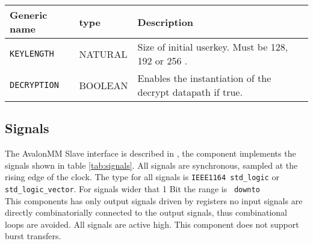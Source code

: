 \documentclass{ruschidoc}
\begin{document}
\begin{tabularx}{\textwidth}{|p{33mm}|p{25mm}|X|}
  \hline
  \bf{Generic name} & \bf{type} & \bf{Description}\\ \hline
  \texttt{KEYLENGTH}  \label{gen:keylength}	& NATURAL   & Size of initial userkey. Must be 128, 192 or 256 \footnotemark[1] . \\ \hline
  \texttt{DECRYPTION} \label{gen:decryption}  & BOOLEAN  & Enables the instantiation of the decrypt datapath if true. \\
\hline
\end{tabularx}
\label{tab:generics}

\subsection{Signals}
\label{sec:signals}
The Avalon\rtm\-MM Slave interface is described in \cite{Altera:Avalon}, the component
implements the signals shown in table \ref{tab:signals}. All signals are synchronous,
sampled at the rising edge of the clock. The type for all signals is \texttt{IEEE1164
    std\_logic} or \texttt{std\_logic\_vector}. For signals wider that 1 Bit the range
is \MSB\ \texttt{downto} \LSB\. \\
This components has only output signals driven by registers no input signals are directly combinatorially connected to the
output signals, thus combinational loops are avoided.  All signals are active
high. This component does not support burst transfers.
\end{document}
